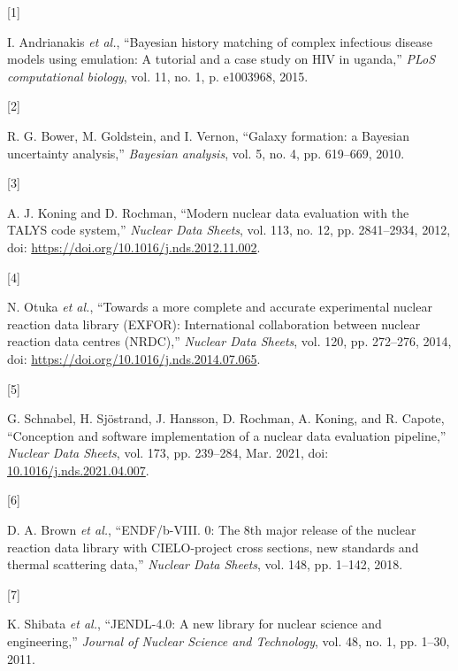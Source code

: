 \documentclass[
  12pt,
  a4paper,
  twoside]{book}
\newlength{\cslhangindent}
\newlength{\csllabelwidth}
\newlength{\cslentryspacingunit} %
\newenvironment{CSLReferences}[2] %
 {%
  \setlength{\parindent}{0pt}
  \ifodd #1
  \let\oldpar\par
  \def\par{\hangindent=\cslhangindent\oldpar}
  \fi
  \setlength{\parskip}{#2\cslentryspacingunit}
 }%
 {}
\newcommand{\CSLLeftMargin}[1]{\parbox[t]{\csllabelwidth}{#1}}
\newcommand{\CSLRightInline}[1]{\parbox[t]{\linewidth - \csllabelwidth}{#1}\break}
\begin{document}
\hypertarget{refs}{}
\begin{CSLReferences}{0}{0}
\leavevmode{}%
\CSLLeftMargin{{[}1{]} }
\CSLRightInline{I. Andrianakis \emph{et al.}, {``Bayesian history matching of complex infectious disease models using emulation: A tutorial and a case study on HIV in uganda,''} \emph{PLoS computational biology}, vol. 11, no. 1, p. e1003968, 2015.}

\leavevmode{}%
\CSLLeftMargin{{[}2{]} }
\CSLRightInline{R. G. Bower, M. Goldstein, and I. Vernon, {``{Galaxy formation: a Bayesian uncertainty analysis},''} \emph{Bayesian analysis}, vol. 5, no. 4, pp. 619--669, 2010.}

\leavevmode{}%
\CSLLeftMargin{{[}3{]} }
\CSLRightInline{A. J. Koning and D. Rochman, {``Modern nuclear data evaluation with the TALYS code system,''} \emph{Nuclear Data Sheets}, vol. 113, no. 12, pp. 2841--2934, 2012, doi: \url{https://doi.org/10.1016/j.nds.2012.11.002}.}

\leavevmode{}%
\CSLLeftMargin{{[}4{]} }
\CSLRightInline{N. Otuka \emph{et al.}, {``Towards a more complete and accurate experimental nuclear reaction data library (EXFOR): International collaboration between nuclear reaction data centres (NRDC),''} \emph{Nuclear Data Sheets}, vol. 120, pp. 272--276, 2014, doi: \url{https://doi.org/10.1016/j.nds.2014.07.065}.}

\leavevmode{}%
\CSLLeftMargin{{[}5{]} }
\CSLRightInline{G. Schnabel, H. Sjöstrand, J. Hansson, D. Rochman, A. Koning, and R. Capote, {``Conception and software implementation of a nuclear data evaluation pipeline,''} \emph{Nuclear Data Sheets}, vol. 173, pp. 239--284, Mar. 2021, doi: \href{https://doi.org/10.1016/j.nds.2021.04.007}{10.1016/j.nds.2021.04.007}.}

\leavevmode{}%
\CSLLeftMargin{{[}6{]} }
\CSLRightInline{D. A. Brown \emph{et al.}, {``ENDF/b-VIII. 0: The 8th major release of the nuclear reaction data library with CIELO-project cross sections, new standards and thermal scattering data,''} \emph{Nuclear Data Sheets}, vol. 148, pp. 1--142, 2018.}

\leavevmode{}%
\CSLLeftMargin{{[}7{]} }
\CSLRightInline{K. Shibata \emph{et al.}, {``JENDL-4.0: A new library for nuclear science and engineering,''} \emph{Journal of Nuclear Science and Technology}, vol. 48, no. 1, pp. 1--30, 2011.}


\end{CSLReferences}
\end{document}
